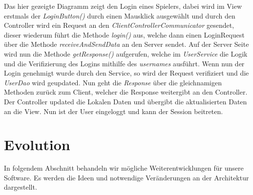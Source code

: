 \documentclass[fontsize=12pt,paper=a4,twoside]{scrartcl}
\begin{document}
Das hier gezeigte Diagramm zeigt den Login eines Spielers, dabei wird im View erstmals der \textit{LoginButton()} durch einen Mausklick ausgewählt und durch den Controller wird ein Request an den \textit{ClientControllerCommunicator} gesendet, dieser wiederum führt die Methode \textit{login()} aus, welche dann einen LoginRequest über die Methode \textit{receiveAndSendData} an den Server sendet. Auf der Server Seite wird nun die Methode \textit{getResponse()} aufgerufen, welche im \textit{UserService} die Logik und die Verifizierung des Logins mithilfe des \textit{usernames} ausführt. Wenn nun der Login genehmigt wurde durch den Service, so wird der Request verifiziert und die \textit{UserDao} wird geupdated. Nun geht die \textit{Response} über die gleichnamigen Methoden zurück zum Client, welcher die Response weitergibt an den Controller. Der Controller updated die Lokalen Daten und übergibt die aktualisierten Daten an die View. Nun ist der User eingeloggt und kann der Session beitreten.


\section{Evolution} \label{sec:evolution}


In folgendem Abschnitt behandeln wir mögliche Weiterentwicklungen für unsere Software. Es werden die Ideen und notwendige Veränderungen an der Architektur dargestellt.
\end{document}
